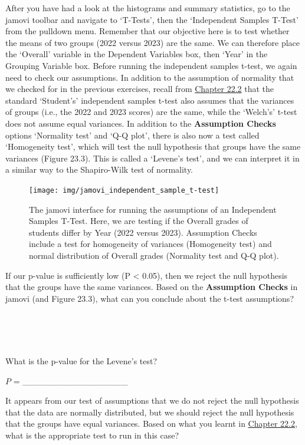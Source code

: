 \documentclass[
  openany]{scrbook}
\begin{document}
After you have had a look at the histograms and summary statistics, go to the jamovi toolbar and navigate to `T-Tests', then the `Independent Samples T-Test' from the pulldown menu.
Remember that our objective here is to test whether the means of two groups (2022 versus 2023) are the same.
We can therefore place the `Overall' variable in the Dependent Variables box, then `Year' in the Grouping Variable box.
Before running the independent samples t-test, we again need to check our assumptions.
In addition to the assumption of normality that we checked for in the previous exercises, recall from \protect\hyperlink{independent-samples-t-test}{Chapter 22.2} that the standard `Student's' independent samples t-test also assumes that the variances of groups (i.e., the 2022 and 2023 scores) are the same, while the `Welch's' t-test does not assume equal variances.
In addition to the \textbf{Assumption Checks} options `Normality test' and `Q-Q plot', there is also now a test called `Homogeneity test', which will test the null hypothesis that groups have the same variances (Figure 23.3).
This is called a `Levene's test', and we can interpret it in a similar way to the Shapiro-Wilk test of normality.

\begin{figure}
\texttt{[image: img/jamovi\_independent\_sample\_t-test]} \caption{The jamovi interface for running the assumptions of an Independent Samples T-Test. Here, we are testing if the Overall grades of students differ by Year (2022 versus 2023). Assumption Checks include a test for homogeneity of variances (Homogeneity test) and normal distribution of Overall grades (Normality test and Q-Q plot).}\label{fig:unnamed-chunk-91}
\end{figure}

If our p-value is sufficiently low (P \textless{} 0.05), then we reject the null hypothesis that the groups have the same variances.
Based on the \textbf{Assumption Checks} in jamovi (and Figure 23.3), what can you conclude about the t-test assumptions?

\begin{verbatim}




\end{verbatim}

What is the p-value for the Levene's test?

\(P\) = \_\_\_\_\_\_\_\_\_\_\_\_\_\_\_\_\_

It appears from our test of assumptions that we do not reject the null hypothesis that the data are normally distributed, but we should reject the null hypothesis that the groups have equal variances.
Based on what you learnt in \protect\hyperlink{independent-samples-t-test}{Chapter 22.2}, what is the appropriate test to run in this case?
\end{document}
